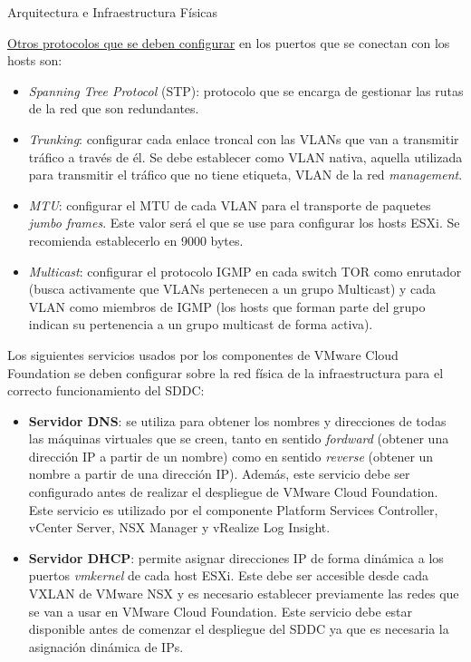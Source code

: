 \begin{subsection}{Arquitectura e Infraestructura Físicas \cite{CFfisInfraestuctura}}
\begin{itemize}
    \underline{Otros protocolos que se deben configurar} en los puertos que se conectan con los hosts son:
    \begin{itemize}
        \item \emph{Spanning Tree Protocol} (STP): protocolo que se encarga de gestionar las rutas de la red que son redundantes.
        \item \emph{Trunking}: configurar cada enlace troncal con las VLANs que van a transmitir tráfico a través de él. Se debe establecer como VLAN nativa, aquella utilizada para transmitir el tráfico que no tiene etiqueta, VLAN de la red \textit{management}.
        \item \emph{MTU}: configurar el MTU de cada VLAN para el transporte de paquetes \textit{jumbo frames}. Este valor será el que se use para configurar los hosts ESXi. Se recomienda establecerlo en 9000 bytes.
        \item \emph{Multicast}: configurar el protocolo IGMP en cada switch TOR como enrutador (busca activamente que VLANs pertenecen a un grupo Multicast) y cada VLAN como miembros de IGMP (los hosts que forman parte del grupo indican su pertenencia a un grupo multicast de forma activa).
    \end{itemize}
    

    

\end{itemize}

Los siguientes servicios usados por los componentes de VMware Cloud Foundation se deben configurar sobre la red física de la infraestructura para el correcto funcionamiento del SDDC\cite{CFexternalServices}:
\begin{itemize}
    \item \textbf{Servidor DNS}: se utiliza para obtener los nombres y direcciones de todas las máquinas virtuales que se creen, tanto en sentido \textit{fordward} (obtener una dirección IP a partir de un nombre) como en sentido \textit{reverse} (obtener un nombre a partir de una dirección IP). Además, este servicio debe ser configurado antes de realizar el despliegue de VMware Cloud Foundation. Este servicio es utilizado por el componente Platform Services Controller, vCenter Server, NSX Manager y vRealize Log Insight.
    
    \item \textbf{Servidor DHCP}: permite asignar direcciones IP de forma dinámica a los puertos \textit{vmkernel} de cada host ESXi. Este debe ser accesible desde cada VXLAN de VMware NSX y es necesario establecer previamente las redes que se van a usar en VMware Cloud Foundation. Este servicio debe estar disponible antes de comenzar el despliegue del SDDC ya que es necesaria la asignación dinámica de IPs.
    

\end{itemize}
\end{subsection}
